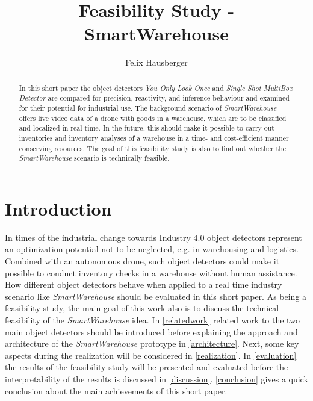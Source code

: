 \documentclass[a4paper, 10pt, journal]{wissarbIEEE}      %
\title{\LARGE \bf Feasibility Study - SmartWarehouse}
\author{Felix Hausberger}
\begin{document}
	

\maketitle

\begin{abstract}

In this short paper the object detectors \textit{You Only Look Once} and \textit{Single Shot MultiBox Detector} are compared for precision, reactivity, and inference behaviour and examined for their potential for industrial use. The background scenario of \textit{SmartWarehouse} offers live video data of a drone with goods in a warehouse, which are to be classified and localized in real time. In the future, this should make it possible to carry out inventories and inventory analyses of a warehouse in a time- and cost-efficient manner conserving resources. The goal of this feasibility study is also to find out whether the \textit{SmartWarehouse} scenario is technically feasible.

\end{abstract}

\section{Introduction}

In times of the industrial change towards Industry 4.0 object detectors represent an optimization potential not to be neglected, e.g. in warehousing and logistics. Combined with an autonomous drone, such object detectors could make it possible to conduct inventory checks in a warehouse without human assistance. How different object detectors behave when applied to a real time industry scenario like \textit{SmartWarehouse} should be evaluated in this short paper. As being a feasibility study, the main goal of this work also is to discuss the technical feasibility of the \textit{SmartWarehouse} idea. In \autoref{relatedwork} related work to the two main object detectors should be introduced before explaining the approach and architecture of the \textit{SmartWarehouse} prototype in \autoref{architecture}. Next, some key aspects during the realization will be considered in \autoref{realization}. In \autoref{evaluation} the results of the feasibility study will be presented and evaluated before the interpretability of the results is discussed in \autoref{discussion}. \autoref{conclusion} gives a quick conclusion about the main achievements of this short paper.
\end{document}
